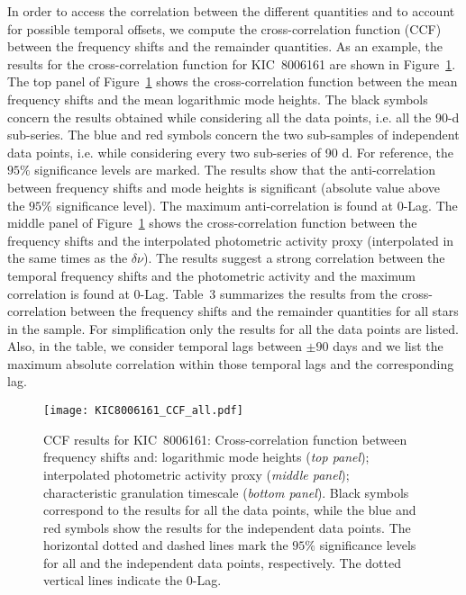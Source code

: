 \documentclass[twocolumn]{aastex61}%
\begin{document}
In order to access the correlation between the different quantities and to account for possible temporal offsets, we compute the cross-correlation function (CCF) between the frequency shifts and the remainder quantities. As an example, the results for the cross-correlation function for KIC~8006161 are shown in Figure~\ref{fig:ccfKIC8006161_hsph}.
The top panel of Figure~\ref{fig:ccfKIC8006161_hsph} shows the cross-correlation function between the mean frequency shifts and the mean logarithmic mode heights. The black symbols concern the results obtained while considering all the data points, i.e. all the 90-d sub-series. The blue and red symbols concern the two sub-samples of independent data points, i.e. while considering every two sub-series of 90 d. For reference, the $95\%$ significance levels are marked. The results show that the anti-correlation between frequency shifts and mode heights is significant (absolute value above the $95\%$ significance level). The maximum anti-correlation is found at 0-Lag.
The middle panel of Figure~\ref{fig:ccfKIC8006161_hsph} shows the cross-correlation function between the frequency shifts and the interpolated photometric activity proxy (interpolated in the same times as the $\delta\nu$). The results suggest a strong correlation between the temporal frequency shifts and the photometric activity and the maximum correlation is found at 0-Lag. Table~3 summarizes the results from the cross-correlation between the frequency shifts and the remainder quantities for all stars in the sample. For simplification only the results for all the data points are listed. Also, in the table, we consider temporal lags between $\pm90$ days and we list the maximum absolute correlation within those temporal lags and the corresponding lag.%

\begin{figure}[h]
\texttt{[image: KIC8006161\_CCF\_all.pdf]}
\caption{CCF results for KIC~8006161: Cross-correlation function between frequency shifts and: logarithmic mode heights ({\it top panel}); interpolated photometric activity proxy ({\it middle panel}); characteristic granulation timescale ({\it bottom panel}). Black symbols correspond to the results for all the data points, while the blue and red symbols show the results for the independent data points. The horizontal dotted and dashed lines mark the $95\%$ significance levels for all and the independent data points, respectively. The dotted vertical lines indicate the 0-Lag.}\label{fig:ccfKIC8006161_hsph}
\end{figure}
\end{document}
